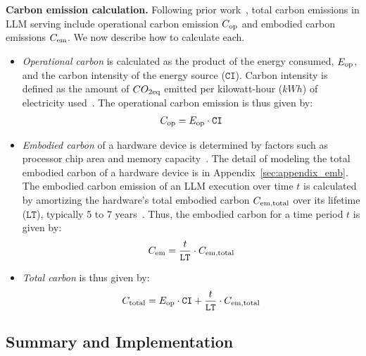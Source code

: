 \noindent \textbf{Carbon emission calculation.} Following prior work~\cite{nguyen2024towards,li2024towards,shi2024greenllm,ding2024sustainable},  total carbon emissions in LLM serving include operational carbon emission $C_{\rm op}$ and embodied carbon emissions $C_{\rm em}$. We now describe how to calculate each.
\begin{itemize}
    \item \emph{Operational carbon} is calculated as the product of the energy consumed, \( E_{\rm op} \), and the carbon intensity of the energy source (\(\texttt{CI}\)). Carbon intensity is defined as the amount of $CO_{\rm 2eq}$ emitted per kilowatt-hour (\(kWh\)) of electricity used~\cite{maji2022carboncast,li2024uncertainty}. The operational carbon emission is thus given by:
\begin{align}\label{eq:carbon-op}
	C_{\rm op} = E_{\rm op} \cdot \texttt{CI}
\end{align}
\item \emph{Embodied carbon} of a hardware device is determined by factors such as processor chip area and memory capacity~\cite{gupta2022act,faiz2024llmcarbon}. The detail of modeling the total embodied carbon of a hardware device is in Appendix~\ref{sec:appendix_emb}. The embodied carbon emission of an LLM execution over time \( t \) is calculated by amortizing the hardware's total embodied carbon $C_{\rm em, total}$ over its lifetime ($\texttt{LT}$), typically 5 to 7 years~\cite{ostrouchov2020gpulife}. Thus, the embodied carbon for a time period \( t \) is given by:
\begin{align}\label{eq:carbon-eb}
	C_{\rm em} = \frac{t}{\texttt{LT}} \cdot C_{\rm em, total}
\end{align}
\item \emph{Total carbon} is thus given by:
\begin{align}\label{eq:carbon-eb}
	C_{\rm total} = E_{\rm op} \cdot \texttt{CI} + \frac{t}{\texttt{LT}} \cdot C_{\rm em, total}
\end{align}
\end{itemize}

\subsection{Summary and Implementation}

